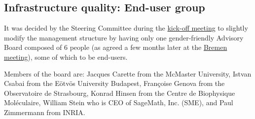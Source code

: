 \documentclass{deliverablereport}
\begin{document}



\subsection{Infrastructure quality: End-user group}


It was decided by the Steering Committee during the
\href{http://opendreamkit.org/meetings/2015-09-02-Kickoff/management_structure/}{kick-off
  meeting} to slightly modify the management structure by having only
one gender-friendly Advisory Board composed of 6 people (as agreed a
few months later at the
\href{http://opendreamkit.org/meetings/2016-06-27-Bremen/minutes/}{Bremen
  meeting}), some of which to be end-users.

Members of the board are: Jacques Carette from the McMaster University, Istvan Csabai from the Eötvös University Budapest,
Françoise Genova from the Observatoire de Strasbourg, Konrad Hinsen from the Centre de Biophysique Moléculaire,
William Stein who is CEO of SageMath, Inc. (SME), and Paul Zimmermann from INRIA.

\printbibliography
\end{document}
